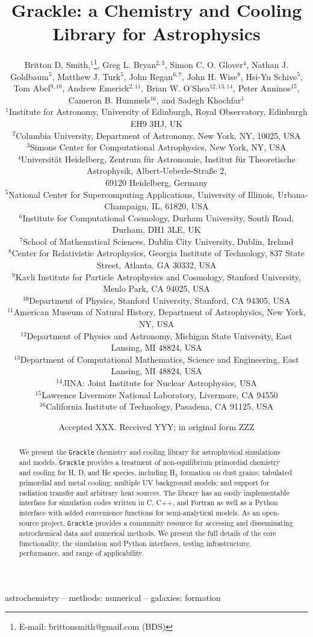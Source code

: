 \documentclass[a4paper,fleqn,usenatbib]{mnras}
\title[The Grackle]{Grackle: a Chemistry and Cooling
  Library for Astrophysics}
\author[B.D. Smith et al.]
       {Britton D. Smith,$^{1}$\thanks{E-mail: brittonsmith@gmail.com
           (BDS)},
        Greg L. Bryan$^{2,3}$,
        Simon C. O. Glover$^{4}$,
        Nathan J. Goldbaum$^{5}$, \newauthor
        Matthew J. Turk$^{5}$,
        John Regan$^{6,7}$,
        John H. Wise$^{8}$,
        Hsi-Yu Schive$^{5}$,
        Tom Abel$^{9,10}$, \newauthor
        Andrew Emerick$^{2,11}$,
        Brian W. O'Shea$^{12,13,14}$,
        Peter Anninos$^{15}$, \newauthor
        Cameron B. Hummels$^{16}$,
        and Sadegh Khochfar$^{1}$\\
$^{1}$Institute for Astronomy, University of Edinburgh, Royal
Observatory, Edinburgh EH9 3HJ, UK\\
$^{2}$Columbia University, Department of Astronomy, New York, NY,
10025, USA\\
$^{3}$Simons Center for Computational Astrophysics, New York, NY,
USA\\
$^{4}$Universit\"{a}t Heidelberg, Zentrum f\"{u}r Astronomie, Institut
f\"{u}r Theoretische Astrophysik, Albert-Ueberle-Stra{\ss}e 2, \\69120
Heidelberg, Germany\\
$^{5}$National Center for Supercomputing Applications, University of
Illinois, Urbana-Champaign, IL, 61820, USA\\
$^{6}$Institute for Computational Cosmology, Durham University, South
Road, Durham, DH1 3LE, UK \\
$^{7}$School of Mathematical Sciences, Dublin City University, Dublin,
Ireland \\
$^{8}$Center for Relativistic Astrophysics, Georgia Institute of
Technology, 837 State Street, Atlanta, GA 30332, USA\\
$^{9}$Kavli Institute for Particle Astrophysics and Cosmology,
Stanford University, Menlo Park, CA 94025, USA\\
$^{10}$Department of Physics, Stanford University, Stanford, CA 94305,
USA\\
$^{11}$American Museum of Natural History, Department of Astrophysics,
New York, NY, USA\\
$^{12}$Department of Physics and Astronomy, Michigan State University,
East Lansing, MI 48824, USA\\
$^{13}$Department of Computational Mathematics, Science and
Engineering, East Lansing, MI 48824, USA\\
$^{14}$JINA: Joint Institute for Nuclear Astrophysics, USA\\
$^{15}$Lawrence Livermore National Laboratory, Livermore, CA 94550\\
$^{16}$California Institute of Technology, Pasadena, CA 91125, USA\\
}
\date{Accepted XXX. Received YYY; in original form ZZZ}
\begin{document}
\label{firstpage}
\pagerange{\pageref{firstpage}--\pageref{lastpage}}
\maketitle

\begin{abstract}
We present the \texttt{Grackle} chemistry and cooling library for
astrophysical simulations and models.  \texttt{Grackle} provides
a treatment of non-equilibrium primordial chemistry and cooling for H, D, and He
species, including H$_{2}$ formation on dust grains; tabulated
primordial and metal cooling; multiple UV background models; and
support for radiation transfer and arbitrary heat sources.  The
library has an easily implementable interface for simulation codes
written in C, C++, and Fortran as well as a Python interface with
added convenience functions for semi-analytical models.  As an
open-source project, \texttt{Grackle} provides a community resource
for accessing and disseminating astrochemical data and numerical
methods.  We present the full details of the core functionality, the
simulation and Python interfaces, testing infrastructure, performance,
and range of applicability.
\end{abstract}

\begin{keywords}
astrochemistry -- methods: numerical -- galaxies: formation
\end{keywords}

















\footnotesize{
  
  
}

\bsp
\label{lastpage}
\end{document}
